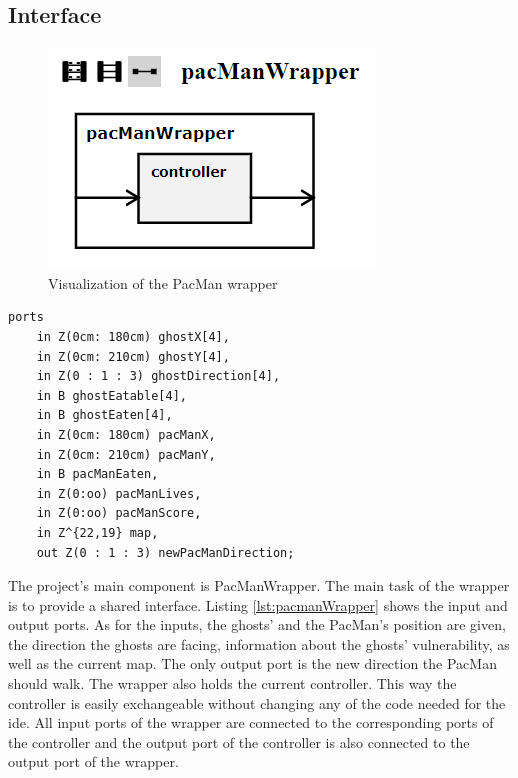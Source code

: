 \subsection{Interface}
\begin{figure}
	\label{fig:visPacmanWrapper}
	\centering
	\includegraphics[scale=0.7]{pictures/VisualizationPacManWrapper.png}
	\caption{Visualization of the PacMan wrapper}
\end{figure}
\begin{lstlisting}[label=lst:pacmanWrapper, caption=Interface of the Pacman Wrapper, morekeywords={ports, port, connect, in, out, instance, ->},
frame=single]
ports 
	in Z(0cm: 180cm) ghostX[4],
	in Z(0cm: 210cm) ghostY[4],
	in Z(0 : 1 : 3) ghostDirection[4],
	in B ghostEatable[4],
	in B ghostEaten[4],
	in Z(0cm: 180cm) pacManX,
	in Z(0cm: 210cm) pacManY,
	in B pacManEaten,
	in Z(0:oo) pacManLives,
	in Z(0:oo) pacManScore,
	in Z^{22,19} map,
	out Z(0 : 1 : 3) newPacManDirection;
\end{lstlisting}
The project's main component is PacManWrapper. The main task of the wrapper is to provide a shared interface. Listing \ref{lst:pacmanWrapper} shows the input and output ports. As for the inputs, the ghosts' and the PacMan's position are given, the direction the ghosts are facing, information about the ghosts' vulnerability, as well as the current map. The only output port is the new direction the PacMan should walk. \newline
The wrapper also holds the current controller. This way the controller is easily exchangeable without changing any of the code needed for the ide. All input ports of the wrapper are connected to the corresponding ports of the controller and the output port of the controller is also connected to the output port of the wrapper. \newline
